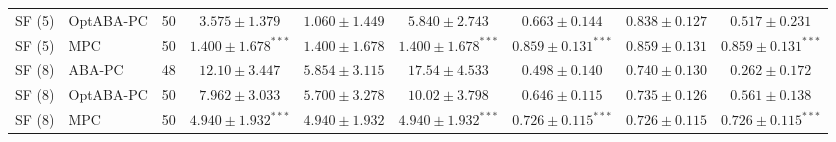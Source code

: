 \begin{table}[t]
{\begin{tabular}{llrcccccc}
SF (5) & OptABA-PC & 50 & $3.575\pm1.379$ & $\mathbf{1.060\pm1.449}$ & $5.840\pm2.743$ & $0.663\pm0.144$ & $\mathbf{0.838\pm0.127}$ & $0.517\pm0.231$\\
SF (5) & MPC & 50 & $\mathbf{1.400\pm1.678}^{\ast\ast\ast}$ & $\mathbf{1.400\pm1.678}$ & $\mathbf{1.400\pm1.678}^{\ast\ast\ast}$ & $\mathbf{0.859\pm0.131}^{\ast\ast\ast}$ & $\mathbf{0.859\pm0.131}$ & $\mathbf{0.859\pm0.131}^{\ast\ast\ast}$\\
\midrule
SF (8) & ABA-PC & 48 & $12.10\pm3.447$ & $\mathbf{5.854\pm3.115}$ & $17.54\pm4.533$ & $0.498\pm0.140$ & $\mathbf{0.740\pm0.130}$ & $0.262\pm0.172$\\
SF (8) & OptABA-PC & 50 & $7.962\pm3.033$ & $\mathbf{5.700\pm3.278}$ & $10.02\pm3.798$ & $0.646\pm0.115$ & $\mathbf{0.735\pm0.126}$ & $0.561\pm0.138$\\
SF (8) & MPC & 50 & $\mathbf{4.940\pm1.932}^{\ast\ast\ast}$ & $\mathbf{4.940\pm1.932}$ & $\mathbf{4.940\pm1.932}^{\ast\ast\ast}$ & $\mathbf{0.726\pm0.115}^{\ast\ast\ast}$ & $\mathbf{0.726\pm0.115}$ & $\mathbf{0.726\pm0.115}^{\ast\ast\ast}$\\
\bottomrule
\end{tabular}%
}
\end{table}
